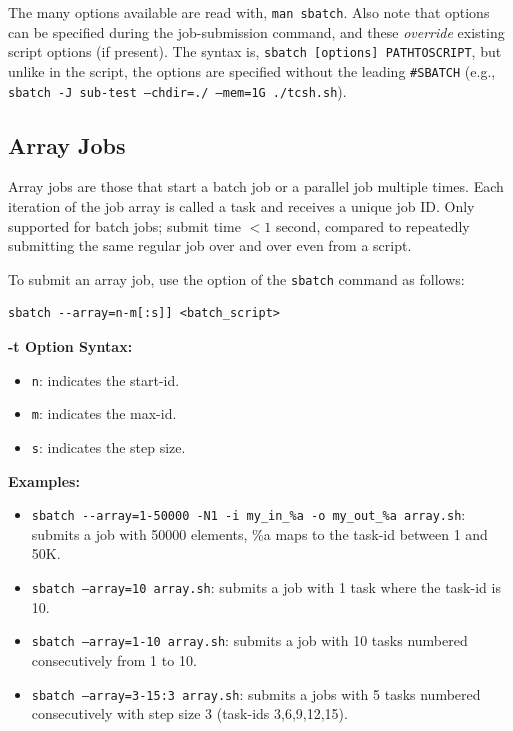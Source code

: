 The many  options available are read with, \texttt{man sbatch}. Also 
note that  options can be specified during the job-submission 
command, and these \emph{override} existing script options (if present). The 
syntax is, \texttt{sbatch [options] PATHTOSCRIPT}, but unlike in the script, 
the options are specified without the leading \verb+#SBATCH+
(e.g., \texttt{sbatch -J sub-test --chdir=./ --mem=1G ./tcsh.sh}).


\subsection{Array Jobs}
\label{sect:array-jobs}

Array jobs are those that start a batch job or a parallel job multiple times. 
Each iteration of the job array is called a task and receives a unique job ID.
Only supported for batch jobs; submit time $< 1$ second, compared to repeatedly
submitting the same regular job over and over even from a script.

To submit an array job, use the  option of the \texttt{sbatch} 
command as follows:

\begin{verbatim}
sbatch --array=n-m[:s]] <batch_script>
\end{verbatim}

\textbf{-t Option Syntax:}
\begin{itemize}
\item
\texttt{n}: indicates the start-id.
\item
\texttt{m}: indicates the max-id.
\item
\texttt{s}: indicates the step size.
\end{itemize}

\textbf{Examples:}
\begin{itemize}
\item
\verb+sbatch --array=1-50000 -N1 -i my_in_%a -o my_out_%a array.sh+: submits a job with 50000 elements,
\%a maps to the task-id between 1 and 50K. 
\item
\texttt{sbatch --array=10 array.sh}: submits a job with 1 task where the task-id is 10. 
\item
\texttt{sbatch --array=1-10 array.sh}: submits a job with 10 tasks numbered consecutively from 1 to 10.
\item
\texttt{sbatch --array=3-15:3 array.sh}: submits a jobs with 5 tasks numbered consecutively with step size 3
(task-ids 3,6,9,12,15).
\end{itemize}

